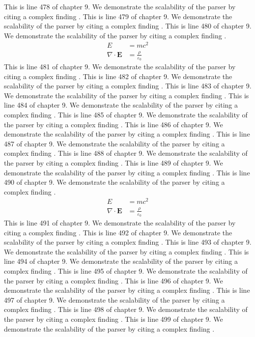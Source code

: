 This is line 478 of chapter 9. We demonstrate the scalability of the parser by citing a complex finding \cite{ref9_478}.
This is line 479 of chapter 9. We demonstrate the scalability of the parser by citing a complex finding \cite{ref9_479}.
This is line 480 of chapter 9. We demonstrate the scalability of the parser by citing a complex finding \cite{ref9_480}.
\begin{align*}
  E &= mc^2 \\
  \nabla \cdot \mathbf{E} &= \frac{\rho}{\varepsilon_0}
\end{align*}
This is line 481 of chapter 9. We demonstrate the scalability of the parser by citing a complex finding \cite{ref9_481}.
This is line 482 of chapter 9. We demonstrate the scalability of the parser by citing a complex finding \cite{ref9_482}.
This is line 483 of chapter 9. We demonstrate the scalability of the parser by citing a complex finding \cite{ref9_483}.
This is line 484 of chapter 9. We demonstrate the scalability of the parser by citing a complex finding \cite{ref9_484}.
This is line 485 of chapter 9. We demonstrate the scalability of the parser by citing a complex finding \cite{ref9_485}.
This is line 486 of chapter 9. We demonstrate the scalability of the parser by citing a complex finding \cite{ref9_486}.
This is line 487 of chapter 9. We demonstrate the scalability of the parser by citing a complex finding \cite{ref9_487}.
This is line 488 of chapter 9. We demonstrate the scalability of the parser by citing a complex finding \cite{ref9_488}.
This is line 489 of chapter 9. We demonstrate the scalability of the parser by citing a complex finding \cite{ref9_489}.
This is line 490 of chapter 9. We demonstrate the scalability of the parser by citing a complex finding \cite{ref9_490}.
\begin{align*}
  E &= mc^2 \\
  \nabla \cdot \mathbf{E} &= \frac{\rho}{\varepsilon_0}
\end{align*}
This is line 491 of chapter 9. We demonstrate the scalability of the parser by citing a complex finding \cite{ref9_491}.
This is line 492 of chapter 9. We demonstrate the scalability of the parser by citing a complex finding \cite{ref9_492}.
This is line 493 of chapter 9. We demonstrate the scalability of the parser by citing a complex finding \cite{ref9_493}.
This is line 494 of chapter 9. We demonstrate the scalability of the parser by citing a complex finding \cite{ref9_494}.
This is line 495 of chapter 9. We demonstrate the scalability of the parser by citing a complex finding \cite{ref9_495}.
This is line 496 of chapter 9. We demonstrate the scalability of the parser by citing a complex finding \cite{ref9_496}.
This is line 497 of chapter 9. We demonstrate the scalability of the parser by citing a complex finding \cite{ref9_497}.
This is line 498 of chapter 9. We demonstrate the scalability of the parser by citing a complex finding \cite{ref9_498}.
This is line 499 of chapter 9. We demonstrate the scalability of the parser by citing a complex finding \cite{ref9_499}.
